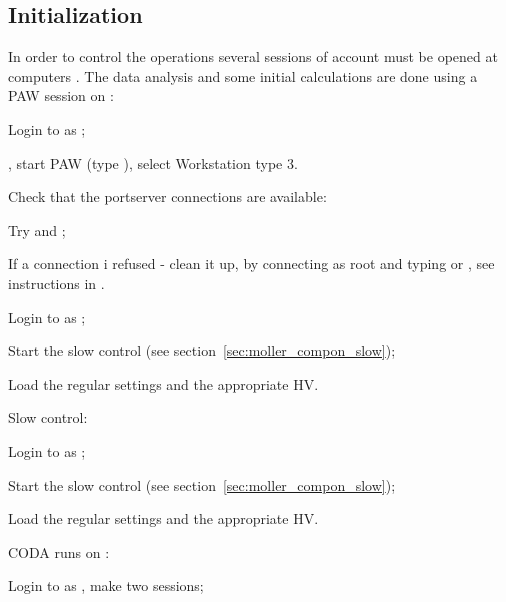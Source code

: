 {\subsection {Initialization}
\label{sec:moller_oper_initial}

In order to control the operations several sessions
of  account must be opened at computers .
The data analysis and some initial calculations are done using a PAW\cite{PAWwww}
session on  :
 \begin{list}{--}{\setlength{\itemsep}{-0.15cm}}
   \item Login to  as ;
   \item {}, start PAW (type ), select Workstation type 3.  
 \end{list}
\noindent
Check that the portserver connections are available:
 \begin{list}{--}{\setlength{\itemsep}{-0.15cm}}
   \item Try  and ;
   \item If a connection i refused - clean it up, by connecting
          as root and typing  or ,
         see instructions in .    
 \end{list}
\noindent
 \begin{list}{--}{\setlength{\itemsep}{-0.15cm}}
   \item Login to  as ;
   \item Start the slow control (see section~\ref{sec:moller_compon_slow});
   \item Load the regular settings and the appropriate HV.
 \end{list}
Slow control:
 \begin{list}{--}{\setlength{\itemsep}{-0.15cm}}
   \item Login to  as ;
   \item Start the slow control (see section~\ref{sec:moller_compon_slow});
   \item Load the regular settings and the appropriate HV.
 \end{list}
\noindent
CODA runs on : 
 \begin{list}{--}{\setlength{\itemsep}{-0.15cm}}
   \item Login to  as , make two sessions;

\end{list}}
